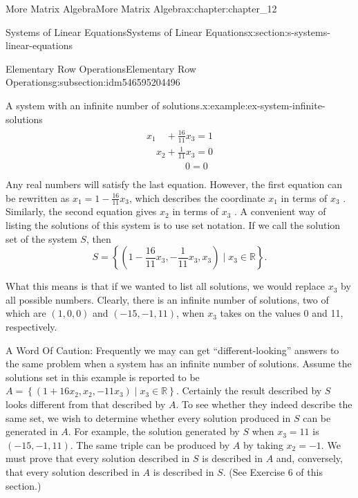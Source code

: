 \documentclass[oneside,10pt,]{book}
\numberwithin{equation}{section}
\begin{document}
\begin{chapterptx}{More Matrix Algebra}{}{More Matrix Algebra}{}{}{x:chapter:chapter_12}
\begin{sectionptx}{Systems of Linear Equations}{}{Systems of Linear Equations}{}{}{x:section:s-systems-linear-equations}
\begin{subsectionptx}{Elementary Row Operations}{}{Elementary Row Operations}{}{}{g:subsection:idm546595204496}
\begin{example}{A system with an infinite number of solutions.}{x:example:ex-system-infinite-solutions}
\begin{gather}
\begin{array}{l}
x_1 \quad+\frac{16}{11} x_3 =1 \\
\quad x_2+\frac{1}{11}x_3 =0\\
\quad\quad\quad \quad 0=0 \\
\end{array}\label{x:mrow:sys-12-1-3-reduced}
\end{gather}
Any real numbers will satisfy the last equation. However, the first equation can be rewritten as \(x_1 =1-\frac{16 }{11}x_3\), which describes the coordinate \(x_1\) in terms of \(x_3\) . Similarly, the second equation gives \(x_2\) in terms of \(x_3\) . A convenient way of listing the solutions of this system is to use set notation. If we call the solution set of the system \(S\), then%
\begin{equation*}
S = \left\{\left(1-\frac{16}{11}x_3, -\frac{1}{11}x_3, x_3\right) \mid x_3\in \mathbb{R}\right\}\text{.}
\end{equation*}
%
\par
What this means is that if we wanted to list all solutions, we would replace \(x_3\) by all possible numbers. Clearly, there is an infinite number of solutions, two of which are \((1, 0, 0)\) and \((-15, -1, 11)\), when \(x_3\) takes on the values 0 and 11, respectively.%
\par
A Word Of Caution: Frequently we may can get ``different-looking'' answers to the same problem when a system has an infinite number of solutions. Assume the solutions set in this example is reported to be \(A = \left\{\left(1+16x_2, x_2, -11x_3\right) \mid x_3\in \mathbb{R}\right\}\). Certainly the result described by \(S\) looks different from that described by \(A\). To see whether they indeed describe the same set, we wish to determine whether every solution produced in \(S\) can be generated in \(A\). For example, the solution generated by \(S\) when \(x_3=11\) is \((-15, -1, 11)\). The same triple can be produced by \(A\) by taking \(x_2= -1\). We must prove that every solution described in \(S\) is described in \(A\) and, conversely, that every solution described in \(A\) is described in \(S\). (See Exercise 6 of this section.)%
\end{example}

\end{subsectionptx}
\end{sectionptx}
\end{chapterptx}
\end{document}
